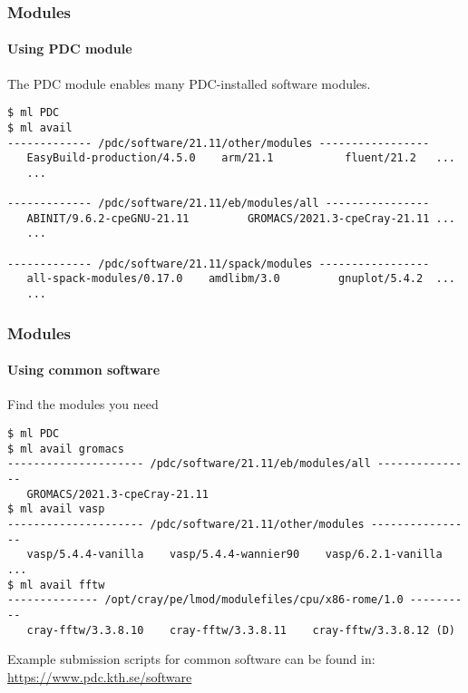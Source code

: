 \begin{frame}[fragile]
\frametitle{Modules}
\framesubtitle{Using PDC module}
\begin{exampleblock}{
The PDC module enables many PDC-installed software modules.
}
\footnotesize
\begin{verbatim}
$ ml PDC
$ ml avail
------------- /pdc/software/21.11/other/modules -----------------
   EasyBuild-production/4.5.0    arm/21.1           fluent/21.2   ...
   ...

------------- /pdc/software/21.11/eb/modules/all ----------------
   ABINIT/9.6.2-cpeGNU-21.11         GROMACS/2021.3-cpeCray-21.11 ...
   ...

------------- /pdc/software/21.11/spack/modules -----------------
   all-spack-modules/0.17.0    amdlibm/3.0         gnuplot/5.4.2  ...
   ...

\end{verbatim}
\end{exampleblock}
\end{frame}



\begin{frame}[fragile]
\frametitle{Modules}
\framesubtitle{Using common software}
\begin{exampleblock}{Find the modules you need}
\footnotesize
\begin{verbatim}
$ ml PDC
$ ml avail gromacs
--------------------- /pdc/software/21.11/eb/modules/all ---------------
   GROMACS/2021.3-cpeCray-21.11
$ ml avail vasp
--------------------- /pdc/software/21.11/other/modules ----------------
   vasp/5.4.4-vanilla    vasp/5.4.4-wannier90    vasp/6.2.1-vanilla  ...
$ ml avail fftw
-------------- /opt/cray/pe/lmod/modulefiles/cpu/x86-rome/1.0 ----------
   cray-fftw/3.3.8.10    cray-fftw/3.3.8.11    cray-fftw/3.3.8.12 (D)
\end{verbatim}
\end{exampleblock}

Example submission scripts for common software can be found in:
\href{https://www.pdc.kth.se/software}{https://www.pdc.kth.se/software}
\end{frame}


